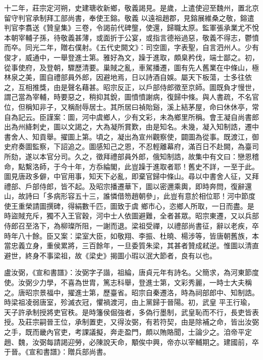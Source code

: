 \begin{pinyinscope}
 十二年，莊宗定河朔，史建瑭收新鄉，敬義謁見。是歲，上遣使迎至魏州，置北京留守判官承制拜工部尚書，奉使王鎔。敬義
 以遠祖趙郡，見鎔展維桑之敬，鎔遣判官李翥送《贊皇集》三卷，令謁前代碑壟，使還，歸職太原。監軍張承業尤不悅本朝宰輔子孫，待敬義甚薄，或面折于公宴，或指言德裕過惡，敬義不得志，鬱憤而卒。同光二年，贈右僕射。《五代史闕文》：司空圖，字表聖，自言泗州人。少有俊才，威通中，一舉登進士第。雅好為文，躁于進取，頗臬矜伐，端士鄙之。初，從事使府，及登朝，驟歷清要。巢賊之亂，車駕播遷，圖有先人舊業在中條山，極林泉之美，圖自禮部員外郎，因避地焉，日以詩酒自娛。屬天下板蕩，士多往依之，互相推獎，由是聲名藉甚。昭宗反正，以戶部侍郎徵至京師。圖既負才慢世，謂己當為宰輔，時要惡之，稍抑其銳，圖憤憤謝病，復歸中條。與人書疏，不名官
 位，但稱知非子，又稱耐辱居士。其所居曰禎貽谿，溪上結茅屋，命曰休休亭，常自為記云。臣謹案：圖，河中虞鄉人，少有文彩，未為鄉里所稱。會王凝自尚書郎出為州絳刺史，圖以文謁之，大為凝所賞歎，由是知名。未幾，凝入知制誥，遷中書舍人、知貢舉。擢圖上第。頃之，凝出為宣州觀察使，闢圖為從事。既渡江，御史府奏圖監察，下詔追之。圖感知己之恩，不忍輕離幕府，滿百日不赴闕，為臺司所劾，遂以本官分司。久之，徵拜禮部員外郎，俄知制誥，故集中有文曰：戀恩稽命，點繫洛師，于今十年，方忝綸閣，此豈躁于進取者耶！舊史不詳，一至于此。圖見唐政多僻，中官用事，知天下必亂，即棄官歸中條山。尋以中書舍人征，又拜禮部、戶部侍郎，皆不起。及昭宗播遷華下，圖以密邇乘輿，即時奔問，復辭還山，故詩曰「多病形容五十三，誰憐借笏趙朝參」，此豈有意於相位耶！河中節度使王重榮請圖撰碑，得絹數千匹，圖致于虞
 鄉市心，恣鄉人所取，一日而盡。是時盜賊充斥，獨不入王官穀，河中士人依圖避難，全者甚眾。昭宗東遷，又以兵部侍郎召至洛下，為柳璨所阻，一謝而退。梁祖受禪，以禮部尚書征，辭以老疾，卒時年八十餘。臣又案：梁室大臣，如敬翔、李振、杜曉、楊涉等，皆唐朝舊族，本當忠義立身，重侯累將，三百餘年，一旦委質朱梁，其甚者贊成弒逆。惟圖以清直避世，終身不事梁祖，故《梁史》揭圖小瑕以泯大節者，良有以也。



 盧汝弼，《宣和書譜》：汝弼字子諧，祖綸，唐貞元年有詩名。父簡求，為河東節度使。汝弼少力學，不喜為世胄，篤志科舉，登進士第，文彩秀麗，一時士大夫稱之。唐昭宗景福中，擢進士第，歷臺省。昭宗自秦遷洛，時為祠部郎中、知制誥。時梁祖凌弱唐室，殄滅衣冠，懼禍渡河，由上黨歸于晉陽。初，武皇
 平王行瑜，天子許承制授將吏官秩。是時籓侯倔強者，多偽行墨制，武皇恥而不行，長吏皆表授。及莊宗嗣晉王位，承制置吏，又得汝弼，有若符契，由是除補之命，皆出汝弼之手，既而畿內官吏，考課議擬，奔走盈門，頗以賄賂聞，士論少之。洎帝平定趙、魏，汝弼每請謁迎勞，必陳說天命，顒俟中興，帝亦以宰輔期之。建國前，卒于晉。《宣和書譜》：贈兵部尚書。




\end{pinyinscope}

